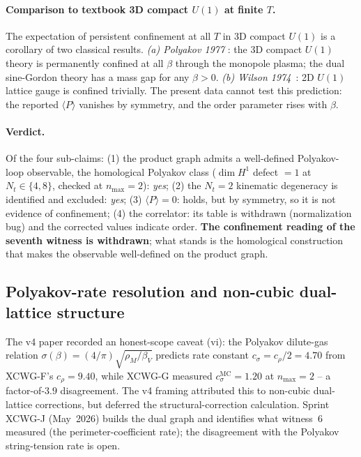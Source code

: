 \documentclass[11pt]{article}
\begin{document}
\paragraph{Comparison to textbook 3D compact $U(1)$ at finite $T$.} The
expectation of persistent confinement at all $T$ in 3D compact $U(1)$ is a
corollary of two classical results.  \emph{(a) Polyakov 1977}
\cite{polyakov1977}: the 3D compact $U(1)$ theory is permanently confined at
all $\beta$ through the monopole plasma; the dual sine-Gordon theory has a
mass gap for any $\beta>0$.  \emph{(b) Wilson 1974}~\cite{wilson1974}: 2D
$U(1)$ lattice gauge is confined trivially.  The present data cannot test
this prediction: the reported $\langle P\rangle$ vanishes by symmetry, and
the order parameter rises with $\beta$.

\paragraph{Verdict.} Of the four sub-claims: (1) the product graph admits
a well-defined Polyakov-loop observable, the homological Polyakov class
($\dim H^1$ defect $=1$ at $N_t\in\{4,8\}$, checked at $n_\text{max} = 2$):
\emph{yes}; (2) the $N_t=2$ kinematic degeneracy is identified and
excluded: \emph{yes}; (3) $\langle P\rangle=0$: holds, but by symmetry,
so it is not evidence of confinement; (4) the correlator: its table is
withdrawn (normalization bug) and the corrected values indicate order.
\textbf{The confinement reading of the seventh witness is withdrawn}; what
stands is the homological construction that makes the observable
well-defined on the product graph.

\subsection{Polyakov-rate resolution and non-cubic dual-lattice structure}
\label{sec:polyakov_rate_resolution}

The v4 paper recorded an honest-scope caveat (vi): the Polyakov dilute-gas
relation $\sigma(\beta)=(4/\pi)\sqrt{\rho_M/\beta_V}$ predicts rate constant
$c_\sigma=c_\rho/2=4.70$ from XCWG-F's $c_\rho=9.40$, while XCWG-G measured
$c_\sigma^\text{MC}=1.20$ at $n_\text{max}=2$ -- a factor-of-$3.9$ disagreement.
The v4 framing attributed this to non-cubic dual-lattice corrections, but
deferred the structural-correction calculation. Sprint XCWG-J (May~2026) builds
the dual graph and identifies what witness~6 measured (the
perimeter-coefficient rate); the disagreement with the Polyakov string-tension
rate is open.
\end{document}
